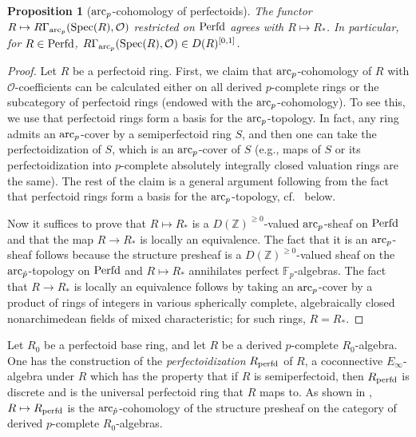\documentclass{amsart}
\newtheorem{proposition}[theorem]{Proposition}
\theoremstyle{definition}
\newcommand{\spec}{\mathrm{Spec}}
\begin{document}
\begin{proposition}[$\mathrm{arc}_{{p}}$-cohomology of perfectoids] 
\label{arccohperfectoid}
The functor $R \mapsto R \Gamma_{\arc}( \spec(R), \mathcal{O})$ restricted on
$\mathrm{Perfd}$ agrees with $R \mapsto R_*$. 
In particular, for $R \in \mathrm{Perfd}$, 
$R \Gamma_{\arc}( \spec(R), \mathcal{O}) \in D(R)^{[0, 1]}$. 
\end{proposition} 
\begin{proof} 
Let $R$ be a perfectoid ring. 
First, we claim that $\mathrm{arc}_{{p}}$-cohomology of $R$ with
$\mathcal{O}$-coefficients can be calculated either on 
all derived $p$-complete rings 
or the subcategory of perfectoid rings (endowed with the $\mathrm{arc}_{{p}}$-cohomology).
To see this, we use that perfectoid rings form a basis for the $\mathrm{arc}_{{p}}$-topology. 
In fact, any ring admits an $\mathrm{arc}_{{p}}$-cover 
by a semiperfectoid ring $S$, and then one can take the perfectoidization 
\cite[Sec.~8]{Prisms} of $S$, which is an $\mathrm{arc}_{{p}}$-cover of $S$ (e.g., maps of
$S$ or its perfectoidization into
$p$-complete absolutely integrally closed valuation rings are the same). 
The rest of the claim is a general argument following from the fact that perfectoid rings form a
basis for the $\mathrm{arc}_{{p}}$-topology, cf.~ below.



Now it suffices to prove that $R \mapsto R_*$ is a $D(\mathbb{Z})^{\geq
0}$-valued $\mathrm{arc}_{{p}}$-sheaf on $\mathrm{Perfd}$ and
that the map $R \to R_*$ is locally an equivalence. The fact that it is an $\mathrm{arc}_{{p}}$-sheaf follows because
the structure presheaf is a $D(\mathbb{Z})^{ \geq 0}$-valued sheaf on the
$\mathrm{arc}_{\hat{p}}$-topology on $\mathrm{Perfd}$ and 
$R \mapsto R_*$ annihilates perfect $\mathbb{F}_p$-algebras. The fact that $R
\to R_*$ is locally an equivalence follows by taking an $\mathrm{arc}_{{p}}$-cover by a product of
rings of integers in various spherically
complete, algebraically closed nonarchimedean fields of mixed characteristic;
for such rings, $R = R_*$. 
\end{proof} 


Let $R_0$ be a perfectoid base ring, and let $R$ be a derived $p$-complete
$R_0$-algebra. 
One has the construction of the \emph{perfectoidization}
$R_{\mathrm{perfd}} $ of $R$, a coconnective $E_\infty$-algebra under $R$ 
which has the property that if $R$ is semiperfectoid, then $R_{\mathrm{perfd}}$ is discrete
and is the universal perfectoid ring that $R$ maps to. 
As shown in \cite[Sec.~8]{Prisms}, $R \mapsto R_{\mathrm{perfd}}$ is the
$\mathrm{arc}_{\hat{p}}$-cohomology
of the structure presheaf on the category of derived $p$-complete $R_0$-algebras. 
\end{document}
